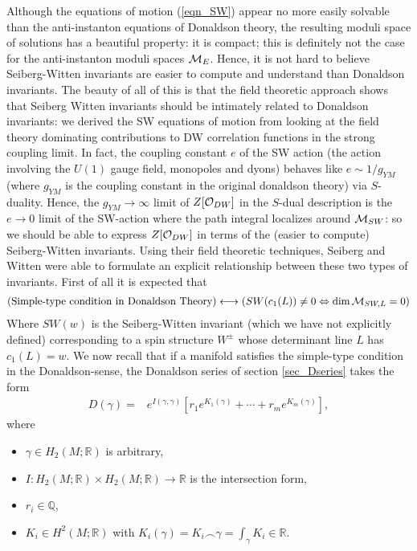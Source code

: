 \documentclass[12pt, onecolumn]{article}
\begin{document}
\noindent Although the equations of motion (\ref{eqn_SW}) appear no more easily solvable than the anti-instanton equations of Donaldson theory, the resulting moduli space of solutions has a beautiful property: it is compact; this is definitely not the case for the anti-instanton moduli spaces ${\cal M}_{E}$.  Hence, it is not hard to believe Seiberg-Witten invariants are easier to compute and understand than Donaldson invariants.  The beauty of all of this is that the field theoretic approach shows that Seiberg Witten invariants should be intimately related to Donaldson invariants: we derived the SW equations of motion from looking at the field theory dominating contributions to DW correlation functions in the strong coupling limit.  In fact, the coupling constant $e$ of the SW action (the action involving the $U(1)$ gauge field, monopoles and dyons) behaves like $e \sim 1/g_{YM}$ (where $g_{YM}$ is the coupling constant in the original donaldson theory) via  $S$-duality.  Hence, the $g_{YM} \rightarrow \infty$ limit of $Z[{\cal O}_{DW}]$ in the $S$-dual description is the $e \rightarrow 0$ limit of the SW-action where the path integral localizes around ${\cal M}_{SW}$: so we should be able to express $Z[{\cal O}_{DW}]$ in terms of the (easier to compute) Seiberg-Witten invariants.  Using their field theoretic techniques, Seiberg and Witten were able to formulate an explicit relationship between these two types of invariants.  First of all it is expected that
\begin{align*}
\left(\text{Simple-type condition in Donaldson Theory}\right) \longleftrightarrow \left(\text{$SW(c_{1}(L)) \neq 0 \Leftrightarrow \dim {\cal M}_{SW,L}=0$}\right)
\end{align*}
Where $SW(w)$ is the Seiberg-Witten invariant (which we have not explicitly defined) corresponding to a spin structure $W^{\pm}$ whose determinant line $L$ has $c_{1}(L)=w$.  We now recall that if a manifold satisfies the simple-type condition in the Donaldson-sense, the Donaldson series of section \ref{sec_Dseries} takes the form
\begin{align*}
D(\gamma)=&e^{I(\gamma,\gamma)}\left[r_{1}e^{K_{1}(\gamma)}+\cdots+r_{m}e^{K_{m}(\gamma)}\right],
\end{align*}
where 
\begin{itemize}
\item $\gamma \in H_{2}(M;\mathbb{R})$ is arbitrary,\\
\item $I:H_{2}(M;\mathbb{R}) \times H_{2}(M;\mathbb{R}) \rightarrow \mathbb{R}$ is the intersection form,
\item $r_{i} \in \mathbb{Q}$,\\
\item $K_{i} \in H^{2}(M;\mathbb{R})$ with $K_{i}(\gamma)=K_{i} \frown \gamma=\int_{\gamma}K_{i} \in \mathbb{R}$.
\end{itemize}
\end{document}
